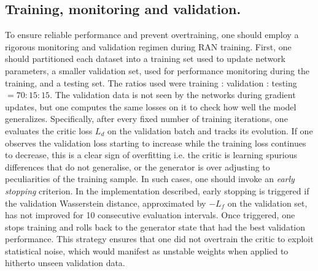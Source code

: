 {{    \subsection{Training, monitoring and validation.}
        To ensure reliable performance and prevent overtraining, one should employ a rigorous monitoring and validation regimen during RAN training.
        First, one should partitioned each dataset into a training set used to update network parameters, a smaller validation set, used for performance monitoring during the training, and a testing set.
        The ratios used were training : validation : testing \(= 70:15:15.\)
        The validation data is not seen by the networks during gradient updates, but one computes the same losses on it to check how well the model generalizes.
        Specifically, after every fixed number of training iterations, one evaluates the critic loss $L_d$ on the validation batch and tracks its evolution.
        If one observes the validation loss starting to increase while the training loss continues to decrease, this is a clear sign of overfitting i.e. the critic is learning spurious differences that do not generalise, or the generator is over adjusting to peculiarities of the training sample.
        In such cases, one should invoke an \emph{early stopping} criterion.
        In the implementation described, early stopping is triggered if the validation Wasserstein distance, approximated by $-L_f$ on the validation set, has not improved for 10 consecutive evaluation intervals.
        Once triggered, one stops training and rolls back to the generator state that had the best validation performance.
        This strategy ensures that one did not overtrain the critic to exploit statistical noise, which would manifest as unstable weights when applied to hitherto unseen validation data.

}}
